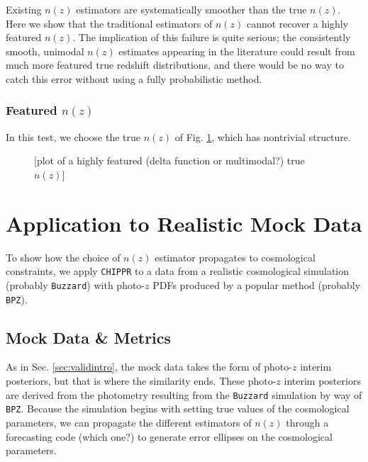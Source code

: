 \documentclass[iop]{emulateapj}
\newcommand{\chippr}{\texttt{CHIPPR} }
\begin{document}
Existing $n(z)$ estimators are systematically smoother than the true $n(z)$.  
Here we show that the traditional estimators of $n(z)$ cannot recover a highly 
featured $n(z)$.  The implication of this failure is quite serious; the 
consistently smooth, unimodal $n(z)$ estimates appearing in the literature 
could result from much more featured true redshift distributions, and there 
would be no way to catch this error without using a fully probabilistic method.

\subsubsection{Featured $n(z)$}
\label{sec:featured}

In this test, we choose the true $n(z)$ of Fig. \ref{fig:featured}, which has 
nontrivial structure.

\begin{figure}
	\begin{center}
		\caption{[plot of a highly featured (delta function or 
multimodal?) true $n(z)$]}
		\label{fig:featured}
	\end{center}
\end{figure}

\section{Application to Realistic Mock Data}
\label{sec:application}

To show how the choice of $n(z)$ estimator propagates to cosmological 
constraints, we apply \chippr to a data from a realistic cosmological 
simulation (probably \texttt{Buzzard}) with photo-$z$ PDFs produced by a 
popular method (probably \texttt{BPZ}).

\subsection{Mock Data \& Metrics}
\label{sec:appintro}

As in Sec. \ref{sec:validintro}, the mock data takes the form of photo-$z$ 
interim posteriors, but that is where the similarity ends.  These photo-$z$ 
interim posteriors are derived from the photometry resulting from the 
\texttt{Buzzard} simulation by way of \texttt{BPZ}.  Because the simulation 
begins with setting true values of the cosmological parameters, we can 
propagate the different estimators of $n(z)$ through a forecasting code (which 
one?) to generate error ellipses on the cosmological parameters.
\end{document}
